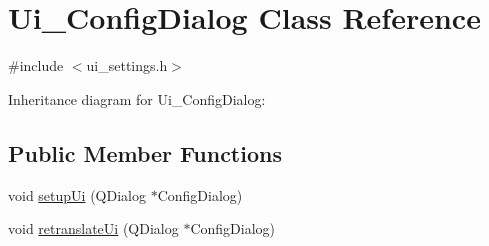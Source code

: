 \hypertarget{class_ui___config_dialog}{}\section{Ui\+\_\+\+Config\+Dialog Class Reference}
\label{class_ui___config_dialog}


{\ttfamily \#include $<$ui\+\_\+settings.\+h$>$}



Inheritance diagram for Ui\+\_\+\+Config\+Dialog\+:
\subsection*{Public Member Functions}
\begin{DoxyCompactItemize}
\item 
void \hyperlink{class_ui___config_dialog_a3b38bb7b9733099bde7fdee708b64fd8}{setup\+Ui} (Q\+Dialog $\ast$Config\+Dialog)
\item 
void \hyperlink{class_ui___config_dialog_ab60d649af45498dee23f4e61fcfe94d8}{retranslate\+Ui} (Q\+Dialog $\ast$Config\+Dialog)
\end{DoxyCompactItemize}
